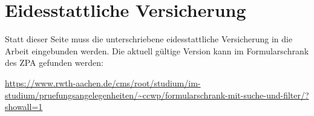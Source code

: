 %
%
%
%
\chapter*{Eidesstattliche Versicherung}
\thispagestyle{empty}
Statt dieser Seite muss die unterschriebene eidesstattliche Versicherung in die Arbeit eingebunden werden. Die aktuell gültige Version kann im Formularschrank des ZPA gefunden werden:


\url{https://www.rwth-aachen.de/cms/root/studium/im-studium/pruefungsangelegenheiten/~ccwp/formularschrank-mit-suche-und-filter/?showall=1}
\newpage

